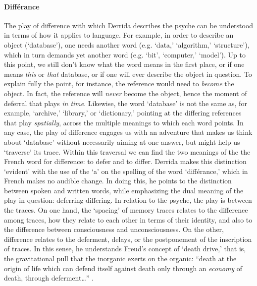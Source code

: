 \paragraph{Différance}
The play of difference with which Derrida describes the psyche can be understood in terms of how it applies to language. For example, in order to describe an object (`database'), one needs another word (e.g. `data,' `algorithm,' `structure'), which in turn demands yet another word (e.g. `bit', `computer,' `model'). Up to this point, we still don't know what the word means in the first place, or if one means \textit{this} or \textit{that} database, or if one will ever describe the object in question. To explain fully the point, for instance, the reference would need to \textit{become} the object. In fact, the reference will \textit{never} become the object, hence the moment of deferral that plays \textit{in time}. Likewise, the word `database' is not the same as, for example, `archive,' `library,' or `dictionary,' pointing at the differing references that play \textit{spatially}, across the multiple meanings to which each word points. In any case, the play of difference engages us with an adventure that makes us think about `database' without necessarily aiming at one answer, but might help us `traverse' its trace. Within this traversal we can find the two meanings of the the French word for difference: to defer and to differ. Derrida makes this distinction `evident' with the use of the `a' on the spelling of the word `différance,' which in French makes no audible change. In doing this, he points to the distinction between spoken and written words, while emphasizing the dual meaning of the play in question: deferring-differing. In relation to the psyche, the play is between the traces. On one hand, the `spacing' of memory traces relates to the difference among traces, how they relate to each other in terms of their identity, and also to the difference between consciousness and unconsciousness. On the other, difference relates to the deferment, delays, or the postponement of the inscription of traces. In this sense, he understands Freud's concept of `death drive,' that is, the gravitational pull that the inorganic exerts on the organic: ``death at the origin of life which can defend itself against death only through an \textit{economy} of death, through deferment\dots'' \parencite[202]{Der78:Wri}.

